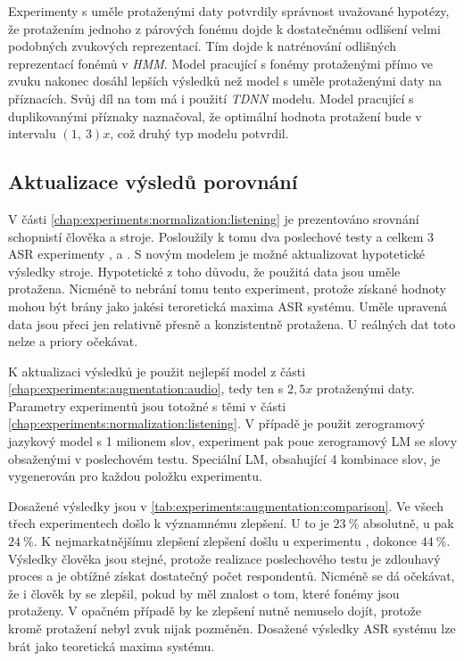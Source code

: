 Experimenty s uměle protaženými daty potvrdily správnost uvažované hypotézy, že protažením jednoho z párových fonému dojde k dostatečnému odlišení velmi podobných zvukových reprezentací. Tím dojde k natrénování odlišných reprezentací fonémů v \textit{HMM}. Model pracující s fonémy protaženými přímo ve zvuku nakonec dosáhl lepších výsledků než model s uměle protaženými daty na příznacích. Svůj díl na tom má i použití \textit{TDNN} modelu. Model pracující s duplikovanými příznaky naznačoval, že optimální hodnota protažení bude v intervalu $\left(1,\ 3\right)x$, což druhý typ modelu potvrdil.

\subsection{Aktualizace výsledů porovnání}
\label{chap:experiments:augmentation:comparison}

V části \ref{chap:experiments:normalization:listening} je prezentováno srovnání schopnistí člověka a stroje. Posloužily k tomu dva poslechové testy a celkem $3$ ASR experimenty ,  a . S novým modelem je možné aktualizovat hypotetické výsledky stroje. Hypotetické z toho důvodu, že použitá data jsou uměle protažena. Nicméně to nebrání tomu tento experiment, protože získané hodnoty mohou být brány jako jakési teroretická maxima ASR systému. Uměle upravená data jsou přeci jen relativně přesně a konzistentně protažena. U reálných dat toto nelze a priory očekávat.

K aktualizaci výsledků je použit nejlepší model z části \ref{chap:experiments:augmentation:audio}, tedy ten s $2,5x$ protaženými daty. Parametry experimentů jsou totožné s těmi v části \ref{chap:experiments:normalization:listening}. V případě  je použit zerogramový jazykový model s 1 milionem slov,  experiment pak poue zerogramový LM se slovy obsaženými v poslechovém testu. Speciální LM, obsahující 4 kombinace slov, je vygenerován pro každou položku  experimentu.

Dosažené výsledky jsou v \ref{tab:experiments:augmentation:comparison}. Ve všech třech experimentech došlo k významnému zlepšení. U  to je $23\ \%$ absolutně, u  pak $24\ \%$. K nejmarkatnějšímu zlepšení zlepšení došlu u experimentu , dokonce $44\ \%$. Výsledky člověka jsou stejné, protože realizace poslechového testu je zdlouhavý proces a je obtížné získat dostatečný počet respondentů. Nicméně se dá očekávat, že i člověk by se zlepšil, pokud by měl znalost o tom, které fonémy jsou protaženy. V opačném případě by ke zlepšení nutně nemuselo dojít, protože kromě protažení nebyl zvuk nijak pozměněn. Dosažené výsledky ASR systému lze brát jako teoretická maxima systému.

